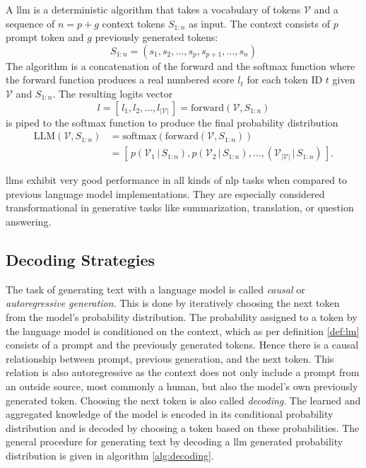     \begin{definition}
        A \acl{llm} is a deterministic algorithm that takes a vocabulary of tokens $\mathcal{V}$ and a sequence of $n = p + g$ context tokens $S_{1:n}$ as input.
        The context consists of $p$ prompt token and $g$ previously generated tokens:
        \begin{equation}
            S_{1:n} = ( s_{1}, s_{2}, \dots, s_{p}, s_{p+1}, \dots, s_{n} )
        \end{equation}
        The algorithm is a concatenation of the forward and the softmax function where the forward function produces a real numbered score $l_t$ for each token ID $t$ given $\mathcal{V}$ and $S_{1:n}$.
        The resulting logits vector
        \begin{equation}
            l = \left[ \, l_1, l_2, \dots, l_{|\mathcal{V}|} \, \right] = \text{forward}(\mathcal{V}, S_{1:n})
        \end{equation}
        is piped to the softmax function to produce the final probability distribution
        \begin{equation}
        \begin{split}
            \mathrm{LLM}(\mathcal{V}, S_{1:n}) &= \text{softmax}(\text{forward}(\mathcal{V}, S_{1:n})) \\
                &= \left[ \, p(\mathcal{V}_1 \, | \, S_{1:n}), p(\mathcal{V}_2 \, | \, S_{1:n}),\dots , (\mathcal{V}_{|\mathcal{V}|} \, | \, S_{1:n}) \, \right] \text{.}
        \end{split}
        \end{equation}
    \end{definition}
    
    \acp{llm} exhibit very good performance in all kinds of \ac{nlp} tasks when compared to previous language model implementations.
    They are especially considered transformational in generative tasks like summarization, translation, or question answering.

    \subsection{Decoding Strategies}
    \label{sec:decodingStrat}
    The task of generating text with a language model is called \emph{causal} or \emph{autoregressive generation}.
    This is done by iteratively choosing the next token from the model's probability distribution.
    The probability assigned to a token by the language model is conditioned on the context, which as per definition \ref{def:lm} consists of a prompt and the previously generated tokens.
    Hence there is a causal relationship between prompt, previous generation, and the next token.
    This relation is also autoregressive as the context does not only include a prompt from an outside source, most commonly a human, but also the model's own previously generated token.
    Choosing the next token is also called \emph{decoding}.
    The learned and aggregated knowledge of the model is encoded in its conditional probability distribution and is decoded by choosing a token based on these probabilities.
    The general procedure for generating text by decoding a \ac{llm} generated probability distribution is given in algorithm \ref{alg:decoding}.

